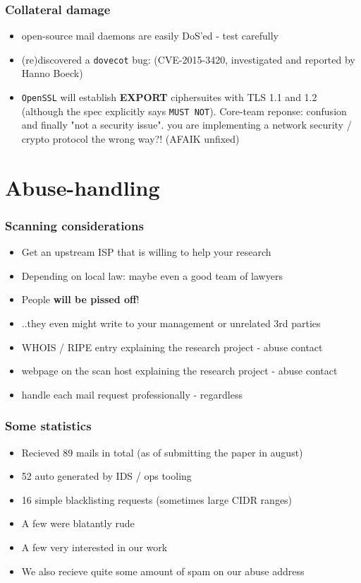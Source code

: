 \documentclass[14pt,aspectratio=43]{beamer}
\begin{document}
\begin{frame}
  \frametitle{Collateral damage}
  \begin{center}
   \begin{itemize}
     \item open-source mail daemons are easily DoS'ed - test carefully
     \item (re)discovered a \texttt{dovecot} bug: (CVE-2015-3420, investigated and reported by Hanno Boeck)
     \item \texttt{OpenSSL} will establish \textbf{EXPORT} ciphersuites with TLS 1.1 and 1.2 (although the spec explicitly says \texttt{MUST NOT}). Core-team reponse: confusion and finally "not a security issue". you are implementing a network security / crypto protocol the wrong way?! (AFAIK unfixed)
   \end{itemize}
  \end{center}
\end{frame}

\section{Abuse-handling}
\sectionpage

\begin{frame}
  \frametitle{Scanning considerations}
  \begin{itemize}
    \item Get an upstream ISP that is willing to help your research
    \item Depending on local law: maybe even a good team of lawyers
    \item People \textbf{will be pissed off}!
    \item ..they even might write to your management or unrelated 3rd parties
    \item WHOIS / RIPE entry explaining the research project - abuse contact
    \item webpage on the scan host explaining the research project - abuse contact
    \item handle each mail request professionally - regardless
  \end{itemize}
\end{frame}

\begin{frame}
  \frametitle{Some statistics}
  \begin{itemize}
    \item Recieved 89 mails in total (as of submitting the paper in august)
    \item 52 auto generated by IDS / ops tooling
    \item 16 simple blacklisting requests (sometimes large CIDR ranges)
    \item A few were blatantly rude
    \item A few very interested in our work
    \item We also recieve quite some amount of spam on our abuse address
  \end{itemize}
\end{frame}
\end{document}
